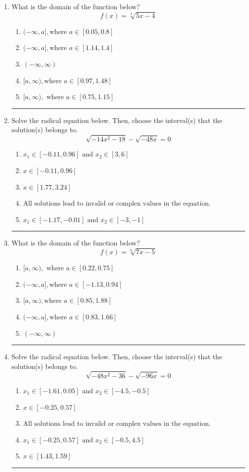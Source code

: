 \documentclass[14pt]{extbook}
\newcommand{\litem}[1]{\item#1\hspace*{-1cm}\rule{\textwidth}{0.4pt}}
\begin{document}
\begin{enumerate}
{\begin{enumerate}[label=\Alph*.]
\end{enumerate} }
\litem{
What is the domain of the function below?\[ f(x) = \sqrt[4]{5 x - 4} \]\begin{enumerate}[label=\Alph*.]
\item \( (-\infty, a], \text{where } a \in [0.05, 0.8] \)
\item \( (-\infty, a], \text{where } a \in [1.14, 1.4] \)
\item \( (-\infty, \infty) \)
\item \( [a, \infty), \text{where } a \in [0.97, 1.48] \)
\item \( [a, \infty), \text{ where } a \in [0.75, 1.15] \)

\end{enumerate} }
\litem{
Solve the radical equation below. Then, choose the interval(s) that the solution(s) belongs to.\[ \sqrt{-14 x^2 - 18} - \sqrt{-48 x} = 0 \]\begin{enumerate}[label=\Alph*.]
\item \( x_1 \in [-0.11, 0.96] \text{ and } x_2 \in [3,6] \)
\item \( x \in [-0.11,0.96] \)
\item \( x \in [1.77,3.24] \)
\item \( \text{All solutions lead to invalid or complex values in the equation.} \)
\item \( x_1 \in [-1.17, -0.01] \text{ and } x_2 \in [-3,-1] \)

\end{enumerate} }
\litem{
What is the domain of the function below?\[ f(x) = \sqrt[6]{7 x - 5} \]\begin{enumerate}[label=\Alph*.]
\item \( [a, \infty), \text{ where } a \in [0.22, 0.75] \)
\item \( (-\infty, a], \text{where } a \in [-1.13, 0.94] \)
\item \( [a, \infty), \text{where } a \in [0.85, 1.88] \)
\item \( (-\infty, a], \text{where } a \in [0.83, 1.66] \)
\item \( (-\infty, \infty) \)

\end{enumerate} }
\litem{
Solve the radical equation below. Then, choose the interval(s) that the solution(s) belongs to.\[ \sqrt{-48 x^2 - 36} - \sqrt{-96 x} = 0 \]\begin{enumerate}[label=\Alph*.]
\item \( x_1 \in [-1.61, 0.05] \text{ and } x_2 \in [-4.5,-0.5] \)
\item \( x \in [-0.25,0.57] \)
\item \( \text{All solutions lead to invalid or complex values in the equation.} \)
\item \( x_1 \in [-0.25, 0.57] \text{ and } x_2 \in [-0.5,4.5] \)
\item \( x \in [1.43,1.59] \)


\end{enumerate}}
\end{enumerate}
\end{document}
